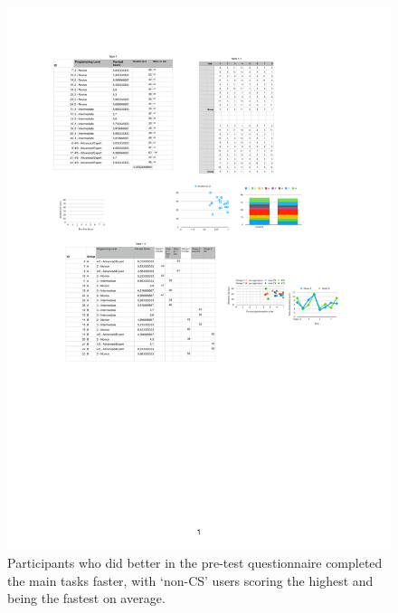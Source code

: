 \begin{figure}[h]%
	\centering
	\includegraphics[width=0.5\columnwidth]{figures/quan-pretest-results.pdf}%
	\caption{Participants who did better in the pre-test questionnaire completed the main tasks faster, with `non-CS' users scoring the highest and being the fastest on average.}\label{fig:pretestvstask}%
\end{figure}%



